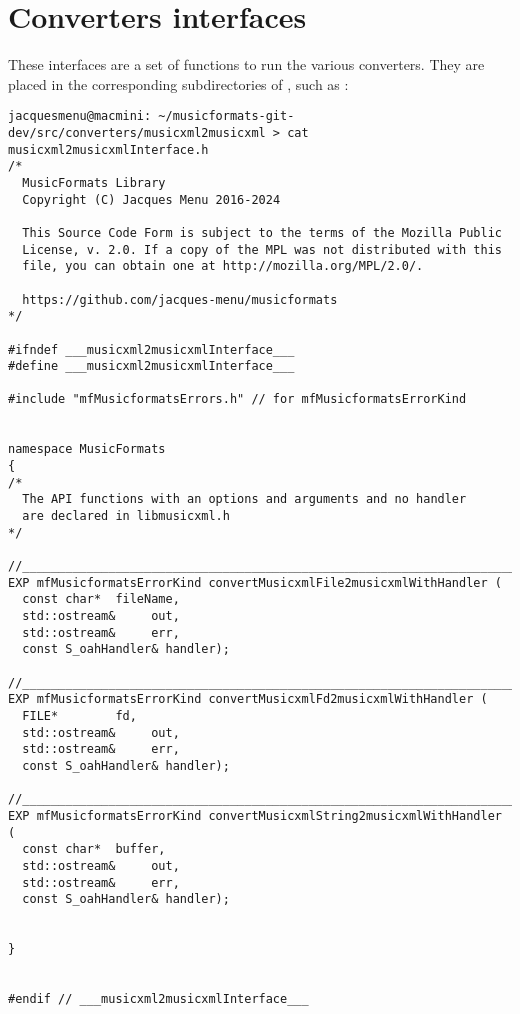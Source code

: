 
\chapter{Converters interfaces}

These interfaces are a set of functions to run the various converters. They are placed in the corresponding subdirectories of \converters, such as :
\begin{lstlisting}[language=Terminal]
jacquesmenu@macmini: ~/musicformats-git-dev/src/converters/musicxml2musicxml > cat musicxml2musicxmlInterface.h
/*
  MusicFormats Library
  Copyright (C) Jacques Menu 2016-2024

  This Source Code Form is subject to the terms of the Mozilla Public
  License, v. 2.0. If a copy of the MPL was not distributed with this
  file, you can obtain one at http://mozilla.org/MPL/2.0/.

  https://github.com/jacques-menu/musicformats
*/

#ifndef ___musicxml2musicxmlInterface___
#define ___musicxml2musicxmlInterface___

#include "mfMusicformatsErrors.h" // for mfMusicformatsErrorKind


namespace MusicFormats
{
/*
  The API functions with an options and arguments and no handler
  are declared in libmusicxml.h
*/

//_______________________________________________________________________________
EXP mfMusicformatsErrorKind convertMusicxmlFile2musicxmlWithHandler (
  const char*  fileName,
  std::ostream&     out,
  std::ostream&     err,
  const S_oahHandler& handler);

//_______________________________________________________________________________
EXP mfMusicformatsErrorKind convertMusicxmlFd2musicxmlWithHandler (
  FILE*        fd,
  std::ostream&     out,
  std::ostream&     err,
  const S_oahHandler& handler);

//_______________________________________________________________________________
EXP mfMusicformatsErrorKind convertMusicxmlString2musicxmlWithHandler (
  const char*  buffer,
  std::ostream&     out,
  std::ostream&     err,
  const S_oahHandler& handler);


}


#endif // ___musicxml2musicxmlInterface___
\end{lstlisting}


